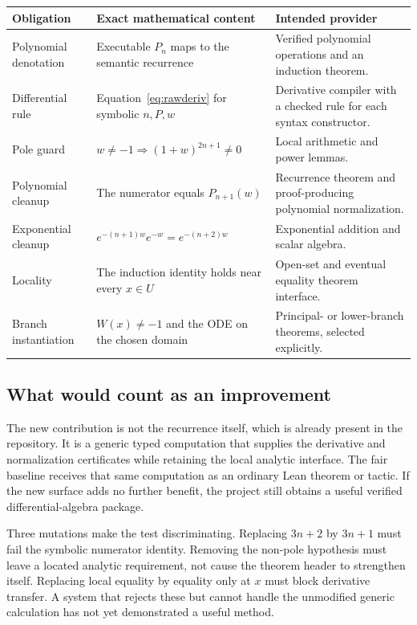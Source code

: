 \documentclass[11pt,a4paper]{article}
\theoremstyle{remark}
\begin{document}
\begin{longtable}{@{}L{.23\textwidth}L{.40\textwidth}L{.29\textwidth}@{}}
\toprule
Obligation & Exact mathematical content & Intended provider \\
\midrule
\endhead
Polynomial denotation & Executable $P_n$ maps to the semantic recurrence &
Verified polynomial operations and an induction theorem.\\
Differential rule & Equation~\eqref{eq:rawderiv} for symbolic $n,P,w$ &
Derivative compiler with a checked rule for each syntax constructor.\\
Pole guard & $w\ne-1\Rightarrow(1+w)^{2n+1}\ne0$ & Local arithmetic and power lemmas.\\
Polynomial cleanup & The numerator equals $P_{n+1}(w)$ & Recurrence theorem and
proof-producing polynomial normalization.\\
Exponential cleanup & $e^{-(n+1)w}e^{-w}=e^{-(n+2)w}$ & Exponential addition and
scalar algebra.\\
Locality & The induction identity holds near every $x\in U$ & Open-set and eventual
equality theorem interface.\\
Branch instantiation & $W(x)\ne-1$ and the ODE on the chosen domain & Principal- or
lower-branch theorems, selected explicitly.\\
\bottomrule
\end{longtable}

\subsection{What would count as an improvement}
The new contribution is not the recurrence itself, which is already present in
the repository. It is a generic typed computation that supplies the derivative
and normalization certificates while retaining the local analytic interface.
The fair baseline receives that same computation as an ordinary Lean theorem or
tactic. If the new surface adds no further benefit, the project still obtains a
useful verified differential-algebra package.

Three mutations make the test discriminating. Replacing $3n+2$ by $3n+1$ must fail
the symbolic numerator identity. Removing the non-pole hypothesis must leave a
located analytic requirement, not cause the theorem header to strengthen itself.
Replacing local equality by equality only at $x$ must block derivative transfer.
A system that rejects these but cannot handle the unmodified generic calculation
has not yet demonstrated a useful method.
\end{document}
